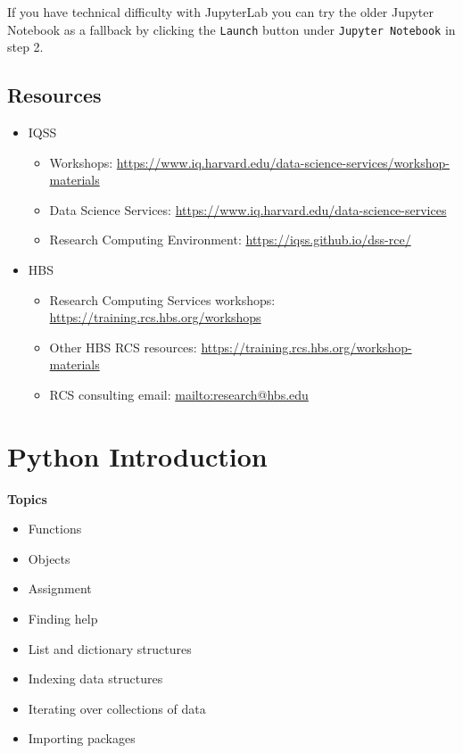 \documentclass[
]{book}
\providecommand{\tightlist}{%
  \setlength{\itemsep}{0pt}\setlength{\parskip}{0pt}}
\begin{document}
If you have technical difficulty with JupyterLab you can try the older Jupyter Notebook as a fallback by clicking the \texttt{Launch} button under \texttt{Jupyter\ Notebook} in step 2.

\hypertarget{resources-6}{%
\section{Resources}\label{resources-6}}

\begin{itemize}
\tightlist
\item
  IQSS

  \begin{itemize}
  \tightlist
  \item
    Workshops: \url{https://www.iq.harvard.edu/data-science-services/workshop-materials}
  \item
    Data Science Services: \url{https://www.iq.harvard.edu/data-science-services}
  \item
    Research Computing Environment: \url{https://iqss.github.io/dss-rce/}
  \end{itemize}
\item
  HBS

  \begin{itemize}
  \tightlist
  \item
    Research Computing Services workshops: \url{https://training.rcs.hbs.org/workshops}
  \item
    Other HBS RCS resources: \url{https://training.rcs.hbs.org/workshop-materials}
  \item
    RCS consulting email: \url{mailto:research@hbs.edu}
  \end{itemize}
\end{itemize}

\hypertarget{python-introduction}{%
\chapter{Python Introduction}\label{python-introduction}}

\textbf{Topics}

\begin{itemize}
\tightlist
\item
  Functions
\item
  Objects
\item
  Assignment
\item
  Finding help
\item
  List and dictionary structures
\item
  Indexing data structures
\item
  Iterating over collections of data
\item
  Importing packages
\end{itemize}
\end{document}
